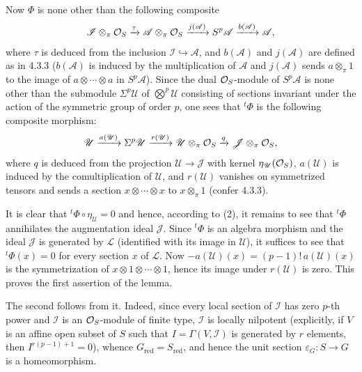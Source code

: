 Now $\Phi$ is none other than the following composite
\[
\mathscr I\otimes_\pi\mathcal{O}_S\xrightarrow{\tau}\mathscr A\otimes_\pi\mathcal{O}_S\xrightarrow{j(\mathscr A)}S^p\mathscr A\xrightarrow{b(\mathscr A)}\mathscr A,
\]
where $\tau$ is deduced from the inclusion $\mathscr I\hookrightarrow\mathscr A$, and $b(\mathscr A)$ and $j(\mathscr A)$ are defined as in 4.3.3 (\ie $b(\mathscr A)$ is induced by the multiplication of $\mathscr A$ and $j(\mathscr A)$ sends $a\otimes_\pi1$ to the image of $a\otimes\cdots\otimes a$ in $S^p\mathscr A$). Since the dual $\mathcal{O}_S$-module of $S^p\mathscr A$ is none other than the submodule $\Sigma^p\mathscr U$ of $\bigotimes^p\mathscr U$ consisting of sections invariant under the action of the symmetric group of order $p$, one sees that ${}^t\Phi$ is the following composite morphism:
\[
\mathscr U\xrightarrow{a(\mathscr U)}\Sigma^p\mathscr U\xrightarrow{r(\mathscr U)}\mathscr U\otimes_\pi\mathcal{O}_S\xrightarrow{q}\mathscr J\otimes_\pi\mathcal{O}_S,
\]
where $q$ is deduced from the projection $\mathscr U\to\mathscr J$ with kernel $\eta_{\mathscr U}(\mathcal{O}_S)$, $a(\mathscr U)$ is induced by the comultiplication of $\mathscr U$, and $r(\mathscr U)$ vanishes on symmetrized tensors and sends a section $x\otimes\cdots\otimes x$ to $x\otimes_\pi1$ (confer 4.3.3).

It is clear that ${}^t\Phi\circ\eta_{\mathscr U}=0$ and hence, according to (2), it remains to see that ${}^t\Phi$ annihilates the augmentation ideal $\mathscr J$. Since ${}^t\Phi$ is an algebra morphism and the ideal $\mathscr J$ is generated by $\mathscr L$ (identified with its image in $\mathscr U$), it suffices to see that ${}^t\Phi(x)=0$ for every section $x$ of $\mathscr L$. Now $-a(\mathscr U)(x)=(p-1)!\,a(\mathscr U)(x)$ is the symmetrization of $x\otimes1\otimes\cdots\otimes1$, hence its image under $r(\mathscr U)$ is zero. This proves the first assertion of the lemma.

The second follows from it. Indeed, since every local section of $\mathscr I$ has zero $p$-th power and $\mathscr I$ is an $\mathcal{O}_S$-module of finite type, $\mathscr I$ is locally nilpotent (explicitly, if $V$ is an affine open subset of $S$ such that $I=\Gamma(V,\mathscr I)$ is generated by $r$ elements, then $I^{r(p-1)+1}=0$), whence $G_{\mathrm{red}}=S_{\mathrm{red}}$, and hence the unit section $\varepsilon_G:S\to G$ is a homeomorphism.

